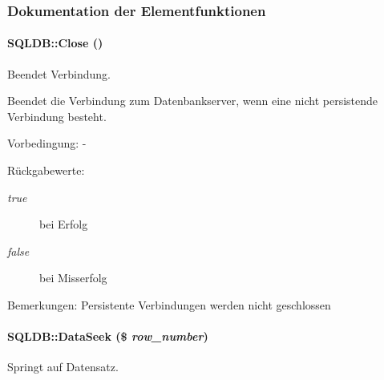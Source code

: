 \subsubsection{Dokumentation der Elementfunktionen}
\hypertarget{classSQLDB_0e82206260d6fc4d0eaec32022125048}{
\paragraph[Close]{\setlength{\rightskip}{0pt plus 5cm}SQLDB::Close ()}\hfill}
\label{classSQLDB_0e82206260d6fc4d0eaec32022125048}


Beendet Verbindung. 

Beendet die Verbindung zum Datenbankserver, wenn eine nicht persistende Verbindung besteht. \begin{Desc}
\item[Vorbedingung:]- \end{Desc}
\begin{Desc}
\item[R\"{u}ckgabewerte:]
\begin{description}
\item[{\em true}]bei Erfolg \item[{\em false}]bei Misserfolg \end{description}
\end{Desc}
\begin{Desc}
\item[Bemerkungen:]Persistente Verbindungen werden nicht geschlossen \end{Desc}
\hypertarget{classSQLDB_0766b746a81684e014c235db35818e54}{
\paragraph[DataSeek]{\setlength{\rightskip}{0pt plus 5cm}SQLDB::Data\-Seek (\$ {\em row\_\-number})}\hfill}
\label{classSQLDB_0766b746a81684e014c235db35818e54}


Springt auf Datensatz. 

